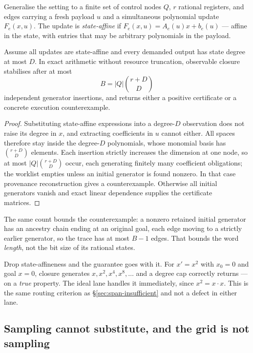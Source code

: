 Generalise the setting to a finite set of control nodes $Q$, $r$ rational
registers, and edges carrying a fresh payload $u$ and a simultaneous polynomial
update $F_e(x,u)$. The update is \emph{state-affine} if
$F_e(x,u)=A_e(u)x+b_e(u)$ --- affine in the state, with entries that may be
arbitrary polynomials in the payload.

\begin{theorem}
\label{thm:decide}
Assume all updates are state-affine and every demanded output has state degree
at most $D$. In exact arithmetic without resource truncation, observable
closure stabilises after at most
\[
 B=|Q|\binom{r+D}{D}
\]
independent generator insertions, and returns either a positive certificate or
a concrete execution counterexample.
\end{theorem}
\begin{proof}
Substituting state-affine expressions into a degree-$D$ observation does not
raise its degree in $x$, and extracting coefficients in $u$ cannot either. All
spaces therefore stay inside the degree-$D$ polynomials, whose monomial basis
has $\binom{r+D}{D}$ elements. Each insertion strictly increases the dimension
at one node, so at most $|Q|\binom{r+D}{D}$ occur, each generating finitely many
coefficient obligations; the worklist empties unless an initial generator is
found nonzero. In that case provenance reconstruction gives a counterexample.
Otherwise all initial generators vanish and exact linear dependence supplies the
certificate matrices.
\end{proof}

The same count bounds the counterexample: a nonzero retained initial generator
has an ancestry chain ending at an original goal, each edge moving to a strictly
earlier generator, so the trace has at most $B-1$ edges. That bounds the word
\emph{length}, not the bit size of its rational states.

\begin{remark}
Drop state-affineness and the guarantee goes with it. For $x'=x^2$ with $x_0=0$
and goal $x=0$, closure generates $x,x^2,x^4,x^8,\ldots$ and a degree cap
correctly returns \unknown{} --- on a \emph{true} property. The ideal lane
handles it immediately, since $x^2=x\cdot x$. This is the same routing
criterion as \S\ref{sec:span-insufficient} and not a defect in either lane.
\end{remark}

\subsection{Sampling cannot substitute, and the grid is not sampling}

